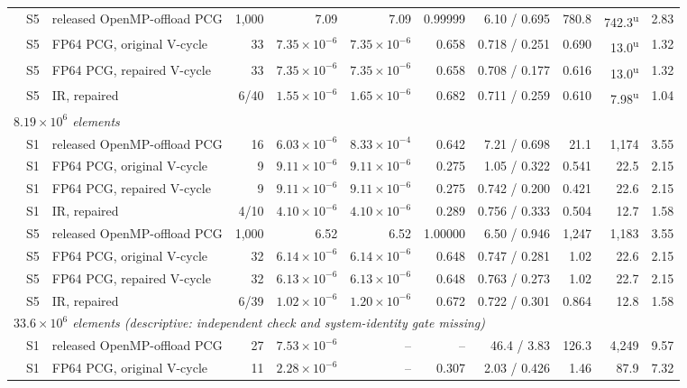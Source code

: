 \begin{tabular}{rllrrrrrrrr}
 & S5 & released OpenMP-offload PCG & 1{,}000 & 7.09 & 7.09 & 0.99999 & 6.10 / 0.695 & 780.8 & 742.3\textsuperscript{u} & 2.83 \\
 & S5 & FP64 PCG, original V-cycle & 33 & $7.35\times10^{-6}$ & $7.35\times10^{-6}$ & 0.658 & 0.718 / 0.251 & 0.690 & 13.0\textsuperscript{u} & 1.32 \\
 & S5 & FP64 PCG, repaired V-cycle & 33 & $7.35\times10^{-6}$ & $7.35\times10^{-6}$ & 0.658 & 0.708 / 0.177 & 0.616 & 13.0\textsuperscript{u} & 1.32 \\
 & S5 & IR, repaired & 6/40 & $1.55\times10^{-6}$ & $1.65\times10^{-6}$ & 0.682 & 0.711 / 0.259 & 0.610 & 7.98\textsuperscript{u} & 1.04 \\
\midrule
\multicolumn{11}{l}{\emph{$8.19\times10^{6}$ elements}} \\
 & S1 & released OpenMP-offload PCG & 16 & $6.03\times10^{-6}$ & $8.33\times10^{-4}$ & 0.642 & 7.21 / 0.698 & 21.1 & 1{,}174 & 3.55 \\
 & S1 & FP64 PCG, original V-cycle & 9 & $9.11\times10^{-6}$ & $9.11\times10^{-6}$ & 0.275 & 1.05 / 0.322 & 0.541 & 22.5 & 2.15 \\
 & S1 & FP64 PCG, repaired V-cycle & 9 & $9.11\times10^{-6}$ & $9.11\times10^{-6}$ & 0.275 & 0.742 / 0.200 & 0.421 & 22.6 & 2.15 \\
 & S1 & IR, repaired & 4/10 & $4.10\times10^{-6}$ & $4.10\times10^{-6}$ & 0.289 & 0.756 / 0.333 & 0.504 & 12.7 & 1.58 \\
 & S5 & released OpenMP-offload PCG & 1{,}000 & 6.52 & 6.52 & 1.00000 & 6.50 / 0.946 & 1{,}247 & 1{,}183 & 3.55 \\
 & S5 & FP64 PCG, original V-cycle & 32 & $6.14\times10^{-6}$ & $6.14\times10^{-6}$ & 0.648 & 0.747 / 0.281 & 1.02 & 22.6 & 2.15 \\
 & S5 & FP64 PCG, repaired V-cycle & 32 & $6.13\times10^{-6}$ & $6.13\times10^{-6}$ & 0.648 & 0.763 / 0.273 & 1.02 & 22.7 & 2.15 \\
 & S5 & IR, repaired & 6/39 & $1.02\times10^{-6}$ & $1.20\times10^{-6}$ & 0.672 & 0.722 / 0.301 & 0.864 & 12.8 & 1.58 \\
\midrule
\multicolumn{11}{l}{\emph{$33.6\times10^{6}$ elements (descriptive: independent check and system-identity gate missing)}} \\
 & S1 & released OpenMP-offload PCG & 27 & $7.53\times10^{-6}$ & -- & -- & 46.4 / 3.83 & 126.3 & 4{,}249 & 9.57 \\
 & S1 & FP64 PCG, original V-cycle & 11 & $2.28\times10^{-6}$ & -- & 0.307 & 2.03 / 0.426 & 1.46 & 87.9 & 7.32 \\

\end{tabular}
